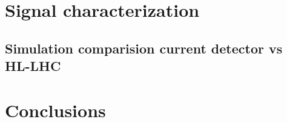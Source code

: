
\chapter{Signal characterization}

\section{Simulation comparision current detector vs HL-LHC}


\chapter{Conclusions}



